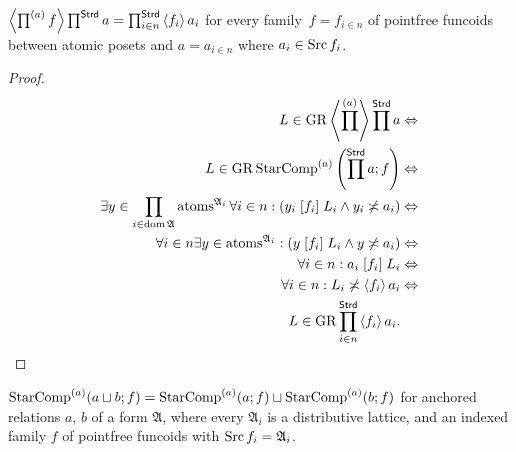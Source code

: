 \begin{thm}
\label{prod-prod}$\left\langle \prod^{(a)}f\right\rangle\prod^{\mathsf{Strd}}a=\prod_{i\in n}^{\mathsf{Strd}}\left\langle f_{i}\right\rangle a_{i}$
for every family~$f=f_{i\in n}$ of pointfree funcoids between atomic
posets and $a=a_{i\in n}$ where $a_{i}\in\operatorname{Src} f_{i}$.\end{thm}
\begin{proof}
~
\begin{align*}
L\in\operatorname{GR}\left\langle \prod^{(a)}\right\rangle\prod^{\mathsf{Strd}}a & \Leftrightarrow\\
L\in\operatorname{GR}\operatorname{StarComp}^{(a)}\left(\prod^{\mathsf{Strd}}a;f\right) & \Leftrightarrow\\
\exists y\in\prod_{i\in\operatorname{dom}\mathfrak{A}}\operatorname{atoms}^{\mathfrak{A}_{i}}\forall i\in n:(y_{i}\mathrel{\left[f_{i}\right]}L_{i}\land y_{i}\not\asymp a_{i}) & \Leftrightarrow\\
\forall i\in n\exists y\in\operatorname{atoms}^{\mathfrak{A}_{i}}:(y\mathrel{\left[f_{i}\right]}L_{i}\land y\not\asymp a_{i}) & \Leftrightarrow\\
\forall i\in n:a_{i}\mathrel{\left[f_{i}\right]}L_{i} & \Leftrightarrow\\
\forall i\in n:L_{i}\not\asymp\left\langle f_{i}\right\rangle a_{i} & \Leftrightarrow\\
L\in\operatorname{GR}\prod_{i\in n}^{\mathsf{Strd}}\left\langle f_{i}\right\rangle a_{i}.
\end{align*}
\end{proof}
\begin{conjecture}
$\operatorname{StarComp}^{(a)}(a\sqcup b;f)=\operatorname{StarComp}^{(a)}(a;f)\sqcup\operatorname{StarComp}^{(a)}(b;f)$
for anchored relations $a$, $b$ of a form $\mathfrak{A}$, where
every $\mathfrak{A}_{i}$ is a distributive lattice, and an indexed
family $f$ of pointfree funcoids with $\operatorname{Src} f_{i}=\mathfrak{A}_{i}$.
\end{conjecture}

